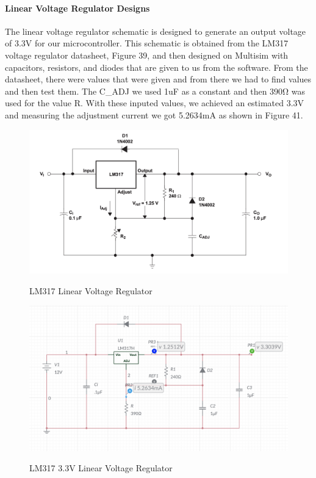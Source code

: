 \paragraph{Linear Voltage Regulator Designs}
The linear voltage regulator schematic is designed to generate an output voltage of 3.3V for our microcontroller. This schematic is obtained from the LM317 voltage regulator datasheet, Figure 39, and then designed on Multisim with capacitors, resistors, and diodes that are given to us from the software. From the datasheet, there were values that were given and from there we had to find values and then test them. The C_{ADJ} we used 1uF as a constant and then 390Ω was used for the value R. With these inputed values, we achieved an estimated 3.3V and measuring the adjustment current we got 5.2634mA as shown in Figure 41.\par
\begin{figure}[H]
    \centering
    \caption{LM317 Linear Voltage Regulator }
    \includegraphics[width=\textwidth]{images/LM317_Application_schematic.png}
    \label{fig:linear-voltage-regulator}
\end{figure}
\begin{figure}[H]
    \centering
    \caption{LM317 3.3V Linear Voltage Regulator}
    \includegraphics[width=\textwidth]{images/LM317_3.3_schematic.png}
    \label{fig:3.3V-linear-voltage-regulator}
\end{figure}
